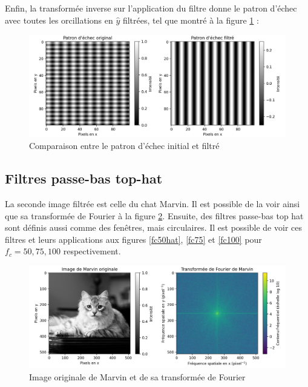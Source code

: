 \documentclass[11pt,letterpaper]{article}
\begin{document}
Enfin, la transformée inverse sur l'application du filtre donne le patron d'échec avec toutes les orcillations en $\hat{y}$ filtrées, tel que montré à la figure \ref{echec_comp} :

\begin{figure}[H]
  \centering
  \includegraphics[scale=0.68]{check_filtre.png}
  \caption{Comparaison entre le patron d'échec initial et filtré}
  \label{echec_comp}
\end{figure}

\subsection{Filtres passe-bas top-hat}

La seconde image filtrée est celle du chat Marvin. Il est possible de la voir ainsi que sa transformée de Fourier à la figure \ref{cat_og}. Ensuite, des filtres passe-bas top hat sont définis aussi comme des fenêtres, mais circulaires. Il est possible de voir ces filtres et leurs applications aux figures \ref{fc50hat}, \ref{fc75} et \ref{fc100} pour $f_c = 50, 75,100$ respectivement.

\begin{figure}[H]
  \centering
  \includegraphics[scale=0.68]{marvin_og.png}
  \caption{Image originale de Marvin et de sa transformée de Fourier}
  \label{cat_og}
\end{figure}
\end{document}
